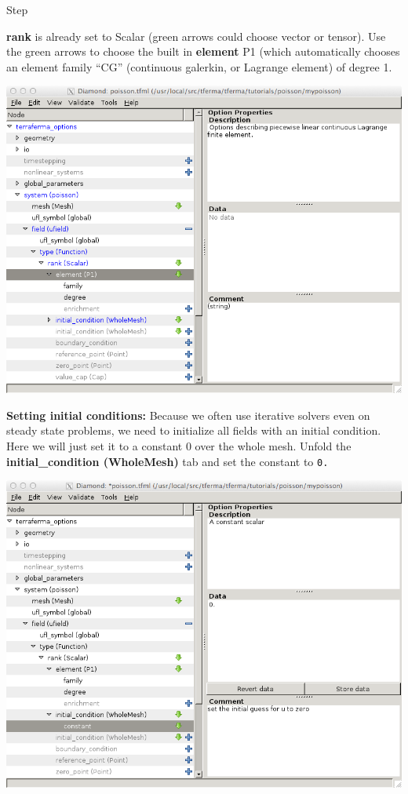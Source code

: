 \begin{steps}{Step}
\begin{center}
\end{center}
\textbf{rank} is already set to Scalar (green arrows could choose
vector or tensor). Use the green arrows to choose the built in
\textbf{element} P1 (which automatically chooses an element family
``CG'' (continuous galerkin, or Lagrange element) of degree 1.
\begin{center}
    \includegraphics[width=\diamondwidth]{figures/screendumps/diamond_poisson_07b.png}
\end{center}
\item \textbf{Setting initial conditions:} Because we
  often use iterative solvers even on steady state problems, we need
  to initialize all fields with an initial condition.  Here we will
  just set it to a constant 0 over the whole mesh.  Unfold the
  \textbf{initial\_condition (WholeMesh)} tab and set the constant to
  \texttt{0.}
\begin{center}
    \includegraphics[width=\diamondwidth]{figures/screendumps/diamond_poisson_07c.png}

\end{center}
\end{steps}
